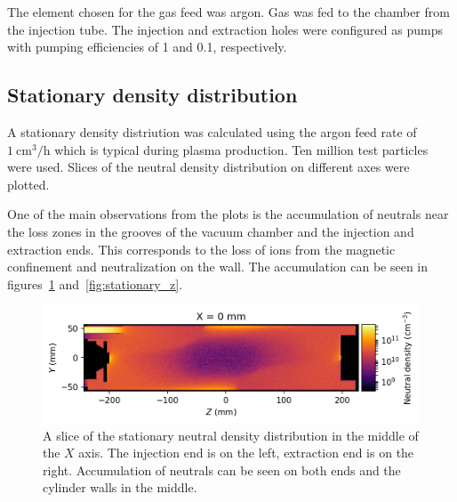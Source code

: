 \documentclass[a4paper,twoside,12pt]{article}
\begin{document}
The element chosen for the gas feed was argon. Gas was fed to the chamber from the injection tube. The injection and extraction holes were configured as pumps with pumping efficiencies of 1 and 0.1, respectively.

\subsection{Stationary density distribution}
A stationary density distriution was calculated using the argon feed rate of $\SI{1}{\centi\metre\cubed\per\hour}$ which is typical during plasma production. Ten million test particles were used. Slices of the neutral density distribution on different axes were plotted.

One of the main observations from the plots is the accumulation of neutrals near the loss zones in the grooves of the vacuum chamber and the injection and extraction ends. This corresponds to the loss of ions from the magnetic confinement and neutralization on the wall. The accumulation can be seen in figures~\ref{fig:stationary_x} and~\ref{fig:stationary_z}.

\begin{figure}
    \centering
    \includegraphics[width=\textwidth]{images/stationary_x_middle.png}
    \caption{A slice of the stationary neutral density distribution in the
    middle of the $X$ axis. The injection end is on the left, extraction end is
    on the right. Accumulation of neutrals can be seen on both ends and the
    cylinder walls in the middle.}
    \label{fig:stationary_x}
\end{figure}
\end{document}
